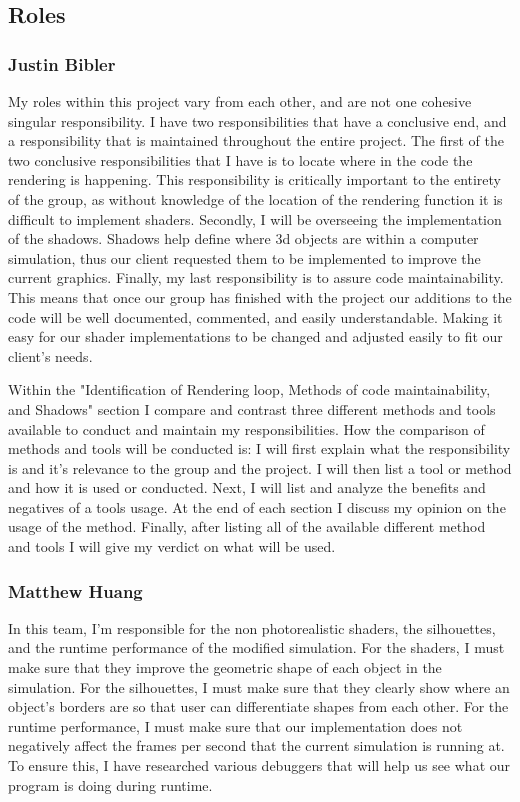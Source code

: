 \newpage

\subsection{Roles}

\subsubsection{Justin Bibler}
My roles within this project vary from each other, and are not one cohesive singular responsibility.
I have two responsibilities that have a conclusive end, and a responsibility that is maintained throughout the entire project.
The first of the two conclusive responsibilities that I have is to locate where in the code the rendering is happening.
This responsibility is critically important to the entirety of the group, as without knowledge of the location of the rendering function it is difficult to implement shaders.
Secondly, I will be overseeing the implementation of the shadows.
Shadows help define where 3d objects are within a computer simulation, thus our client requested them to be implemented to improve the current graphics.
Finally, my last responsibility is to assure code maintainability.
This means that once our group has finished with the project our additions to the code will be well documented, commented, and easily understandable.
Making it easy for our shader implementations to be changed and adjusted easily to fit our client's needs. \par
Within the "Identification of Rendering loop, Methods of code maintainability, and Shadows" section I compare and contrast three different methods and tools available to conduct and maintain my responsibilities.
How the comparison of methods and tools will be conducted is: I will first explain what the responsibility is and it's relevance to the group and the project.
I will then list a tool or method and how it is used or conducted.
Next, I will list and analyze the benefits and negatives of a tools usage.
At the end of each section I discuss my opinion on the usage of the method.
Finally, after listing all of the available different method and tools I will give my verdict on what will be used.

\subsubsection{Matthew Huang}
In this team, I'm responsible for the non photorealistic shaders, the silhouettes, and the runtime performance of the modified simulation.
For the shaders, I must make sure that they improve the geometric shape of each object in the simulation.
For the silhouettes, I must make sure that they clearly show where an object's borders are so that user can differentiate shapes from each other.
For the runtime performance, I must make sure that our implementation does not negatively affect the frames per second that the current simulation is running at.
To ensure this, I have researched various debuggers that will help us see what our program is doing during runtime.


